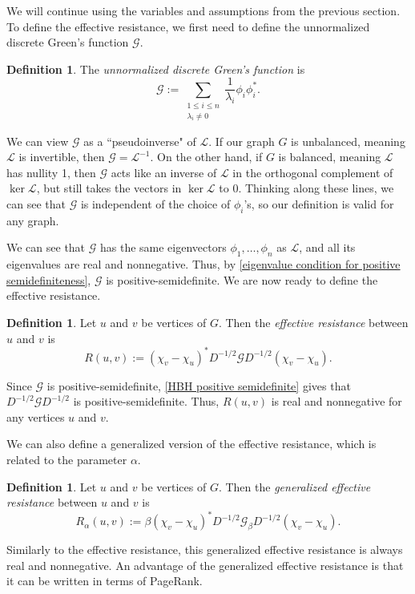 \documentclass[12pt]{article}
\theoremstyle{definition}
\newtheorem{defn}[thm]{Definition}
\newcommand{\lap}{\mathcal{L}}
\newcommand{\green}{\mathcal{G}}
\begin{document}
We will continue using the variables and assumptions from the previous section. To define the effective resistance, we first need to define the unnormalized discrete Green's function $\green$.

\begin{defn}
The \textit{unnormalized discrete Green's function} is 
$$
\green := \sum_{\substack{1 \leq i \leq n \\ \lambda_i \neq 0}} \frac{1}{\lambda_i} \phi_i \phi_i^*.
$$
\end{defn}

We can view $\green$ as a ``pseudoinverse" of $\lap$. If our graph $G$ is unbalanced, meaning $\lap$ is invertible, then $\green = \lap^{-1}$. On the other hand, if $G$ is balanced, meaning $\lap$ has nullity 1, then $\green$ acts like an inverse of $\lap$ in the orthogonal complement of $\ker \lap$, but still takes the vectors in $\ker \lap$ to 0. Thinking along these lines, we can see that $\green$ is independent of the choice of $\phi_i$'s, so our definition is valid for any graph.

We can see that $\green$ has the same eigenvectors $\phi_1, \dots, \phi_n$ as $\lap$, and all its eigenvalues are real and nonnegative. Thus, by \cref{eigenvalue condition for positive semidefiniteness}, $\green$ is positive-semidefinite. We are now ready to define the effective resistance.

\begin{defn}
Let $u$ and $v$ be vertices of $G$. Then the \textit{effective resistance} between $u$ and $v$ is 
$$
R(u, v) := (\chi_v - \chi_u)^* D^{-1/2} \green D^{-1/2} (\chi_v - \chi_u).
$$
\end{defn}

Since $\green$ is positive-semidefinite, \cref{HBH positive semidefinite} gives that $D^{-1/2} \green D^{-1/2}$ is positive-semidefinite. Thus, $R(u, v)$ is real and nonnegative for any vertices $u$ and $v$.

We can also define a generalized version of the effective resistance, which is related to the parameter $\alpha$.

\begin{defn}
Let $u$ and $v$ be vertices of $G$. Then the \textit{generalized effective resistance} between $u$ and $v$ is 
$$
R_\alpha(u, v) := \beta (\chi_v - \chi_u)^* D^{-1/2} \green_\beta D^{-1/2} (\chi_v - \chi_u).
$$
\end{defn}

Similarly to the effective resistance, this generalized effective resistance is always real and nonnegative. An advantage of the generalized effective resistance is that it can be written in terms of PageRank.
\end{document}
